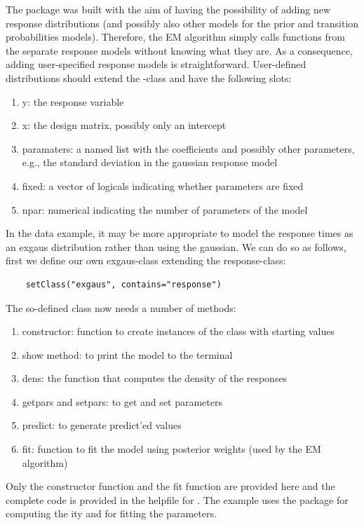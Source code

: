 \documentclass[article]{jss}
\begin{document}
The  package was built with the aim of having the 
possibility of adding new response distributions (and possibly also 
other models for the prior and transition probabilities models). 
Therefore, the EM algorithm simply calls  functions from the 
separate response models without knowing what they are. As a 
consequence, adding user-specified response models is straightforward. 
User-defined distributions should extend the -class 
and have the following slots:
\begin{enumerate}
	\item y: the response variable
	\item x: the design matrix, possibly only an intercept
	\item paramaters: a named list with the coefficients and possibly 
	other parameters, e.g., the standard deviation in the gaussian 
	response model
	\item fixed: a vector of logicals indicating whether parameters are 
	fixed
	\item npar: numerical indicating the number of parameters of the model
\end{enumerate}

In the  data example, it may be more appropriate to model
the response times as an exgaus distribution rather than using the
gaussian.  We can do so as follows, first we define our own
exgaus-class extending the response-class:
\begin{verbatim}
	setClass("exgaus", contains="response")
\end{verbatim}

The so-defined class now needs a number of methods: 
\begin{enumerate}
	\item constructor: function to create instances of the class 
	with starting values
	\item show method: to print the model to the terminal
	\item dens: the function that computes the density of the responses
	\item getpars and setpars: to get and set parameters 
	\item predict: to generate predict'ed values 
	\item fit: function to fit the model using posterior weights (used 
	by the EM algorithm)
\end{enumerate}

Only the constructor function and the fit function are provided here
and the complete code is provided in the helpfile for . 
The  example uses the  package for 
computing the ity and for fitting the parameters. 
\end{document}
